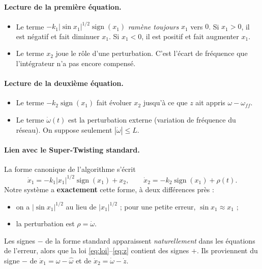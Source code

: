 \documentclass[11pt,a4paper]{article}
\newcommand{\sign}{\operatorname{sign}}
\newcommand{\hw}{\hat{\omega}}
\begin{document}
\paragraph{Lecture de la première équation.}
\begin{itemize}
  \item Le terme $-k_1|\sin x_1|^{1/2}\sign(x_1)$ \emph{ramène toujours} $x_1$ vers $0$.
        Si $x_1>0$, il est négatif et fait diminuer $x_1$. Si $x_1<0$, il est positif et fait augmenter $x_1$.
  \item Le terme $x_2$ joue le rôle d'une perturbation. C'est l'écart de fréquence que
        l'intégrateur n'a pas encore compensé.
\end{itemize}

\paragraph{Lecture de la deuxième équation.}
\begin{itemize}
  \item Le terme $-k_2\sign(x_1)$ fait évoluer $x_2$ jusqu'à ce que $z$ ait appris $\omega-\omega_{ff}$.
  \item Le terme $\dot\omega(t)$ est la perturbation externe (variation de fréquence du réseau).
        On suppose seulement $|\dot\omega|\le L$.
\end{itemize}

\paragraph{Lien avec le Super-Twisting standard.} La forme canonique de l'algorithme s'écrit
\begin{equation}
\dot x_1 = -k_1|x_1|^{1/2}\sign(x_1) + x_2,\qquad \dot x_2 = -k_2\sign(x_1) + \rho(t).
\end{equation}
Notre système a \textbf{exactement} cette forme, à deux différences près :
\begin{itemize}
  \item on a $|\sin x_1|^{1/2}$ au lieu de $|x_1|^{1/2}$ ; pour une petite erreur, $\sin x_1\approx x_1$ ;
  \item la perturbation est $\rho=\dot\omega$.
\end{itemize}
Les signes \og $-$\fg{} de la forme standard apparaissent \emph{naturellement} dans les équations
de l'erreur, alors que la loi \eqref{eq:loi}--\eqref{eq:z} contient des signes \og $+$\fg.
Ils proviennent du signe \og $-$\fg{} de $\dot x_1 = \omega - \hw$ et de $\dot x_2 = \dot\omega - \dot z$.
\end{document}
